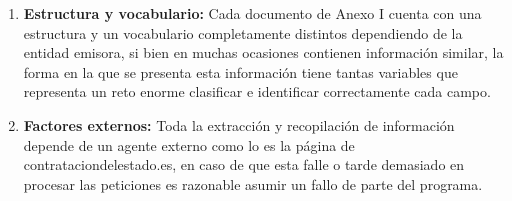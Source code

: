 \documentclass{article}
\begin{document}
\begin{enumerate}
    \item \textbf{Estructura y vocabulario:} 
    Cada documento de Anexo I cuenta con una estructura y un vocabulario completamente distintos dependiendo de la entidad emisora, si bien en muchas ocasiones contienen información similar, la forma en la que se presenta esta información tiene tantas variables que representa un reto enorme clasificar e identificar correctamente cada campo.
    
    \item \textbf{Factores externos:} 
    Toda la extracción y recopilación de información depende de un agente externo como lo es la página de contrataciondelestado.es, en caso de que esta falle o tarde demasiado en procesar las peticiones es razonable asumir un fallo de parte del programa.
    
\end{enumerate}
\end{document}
